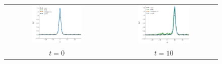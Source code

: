 


\begin{figure}[t]
\begin{center}
\begin{tabular}{cc}
	\includegraphics[width=0.5\textwidth]{./figs/schrodinger/solution/solution_t0} &
	\includegraphics[width=0.5\textwidth]{./figs/schrodinger/solution/solution_t10} \\
	$t = 0$ & $t = 10$
\end{tabular}
\end{center}
\end{figure}

